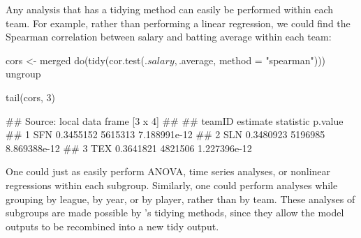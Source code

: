 Any analysis that has a tidying method can easily be performed within each team. For example, rather than performing a linear regression, we could find the Spearman correlation between salary and batting average within each team:


\begin{example}
cors <- merged %
    do(tidy(cor.test(.$salary, .$average, method = "spearman"))) %
    ungroup %
\end{example}

\begin{example}
tail(cors, 3)
\end{example}

\begin{example}
## Source: local data frame [3 x 4]
## 
##   teamID  estimate statistic      p.value
## 1    SFN 0.3455152   5615313 7.188991e-12
## 2    SLN 0.3480923   5196985 8.869388e-12
## 3    TEX 0.3641821   4821506 1.227396e-12

\end{example}


One could just as easily perform ANOVA, time series analyses, or nonlinear regressions within each subgroup. Similarly, one could perform analyses while grouping by league, by year, or by player, rather than by team. These analyses of subgroups are made possible by 's tidying methods, since they allow the model outputs to be recombined into a new tidy output.

